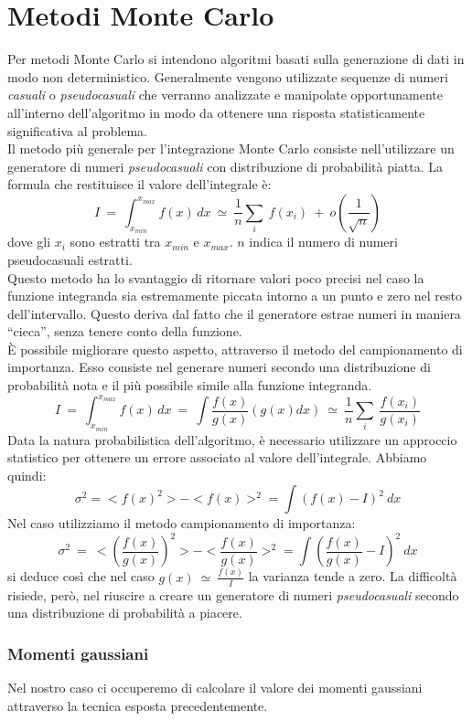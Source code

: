 \section{Metodi Monte Carlo}
\label{sec:Monte Carlo}
Per metodi Monte Carlo si intendono algoritmi basati sulla generazione di dati in modo non deterministico.
Generalmente vengono utilizzate sequenze di numeri \emph{casuali} o \emph{pseudocasuali} che verranno analizzate e 
manipolate opportunamente all'interno dell'algoritmo in modo da ottenere una risposta statisticamente significativa al problema.\\
Il metodo più generale per l'integrazione Monte Carlo consiste nell'utilizzare un generatore di numeri \emph{pseudocasuali} con distribuzione
di probabilità piatta. La formula che restituisce il valore dell'integrale è:
$$
    I \ = \ \int_{x_{min}}^{x_{max}} f(x) \, dx \ \simeq \ \frac{1}{n} \sum_i \ f(x_i) \ + \ o\left(\frac{1}{\sqrt{n}}\right)
$$
dove gli $x_i$ sono estratti tra $x_{min}$ e $x_{max}$. $n$ indica il numero di numeri pseudocasuali estratti.\\
Questo metodo ha lo svantaggio di ritornare valori poco precisi nel caso la funzione integranda sia estremamente piccata intorno a un punto e
zero nel resto dell'intervallo. Questo deriva dal fatto che il generatore estrae numeri in maniera ``cieca'', senza tenere conto della funzione.\\
È possibile migliorare questo aspetto, attraverso il metodo del campionamento di importanza. Esso consiste nel generare numeri secondo una distribuzione
di probabilità nota e il più possibile simile alla funzione integranda. 
$$
 I \ = \ \int_{x_{min}}^{x_{max}} f(x) \, dx \ = \ \int \frac{f(x)}{g(x)} \left( g(x) dx \right) \ \simeq \ \frac{1}{n} \sum_i \ \frac{f(x_i)}{g(x_i)} 
$$
Data la natura probabilistica dell'algoritmo, è necessario utilizzare un approccio statistico per ottenere un errore associato al valore dell'integrale.
Abbiamo quindi:
$$
  \sigma^2 = <{f(x)}^2> - <{f(x)}>^2 = \int (f(x) - I)^2 \ dx  
$$
Nel caso utilizziamo il metodo campionamento di importanza:
$$
\sigma^2 \ = \ <{\left(\frac{f(x)}{g(x)}\right)}^2> - <{\frac{f(x)}{g(x)}}>^2 = \int \left(\frac{f(x)}{g(x)} - I\right)^2 \ dx  
$$
si deduce così che nel caso $ g(x) \ \simeq \ \frac{f(x)}{I}$ la varianza tende a zero.
La difficoltà risiede, però, nel riuscire a creare un generatore di numeri \emph{pseudocasuali} secondo una distribuzione di probabilità a piacere.
\subsubsection*{Momenti gaussiani}
Nel nostro caso ci occuperemo di calcolare il valore dei momenti gaussiani attraverso la tecnica esposta precedentemente. 




